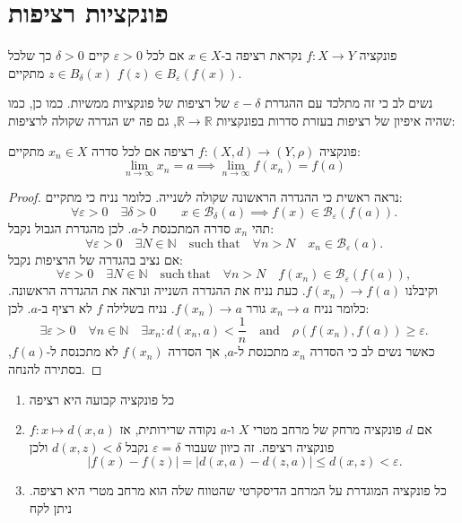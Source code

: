 \documentclass{tstextbook}
\begin{document}
\section{פונקציות רציפות}

\begin{definition}[רציפות]
פונקציה \(f:X\to Y\) נקראת רציפה ב-\(x \in X\) אם לכל \(\varepsilon>0\) קיים \(\delta>0\) כך שלכל \(z\in B_{\delta}(x)\) מתקיים \(f(z)\in B_{\varepsilon}(f(x))\).

\end{definition}
נשים לב כי זה מתלכד עם ההגדרת \(\varepsilon-\delta\) של רציפות של פונקציות ממשיות. כמו כן, כמו שהיה איפיון של רציפות בעזרת סדרות בפונקציות \(\mathbb{R}\to\mathbb{R}\), גם פה יש הגדרה שקולה לרציפות:

\begin{proposition}
פונקציה \(f:(X,d)\to\left( Y,\rho \right)\) רציפה אם לכל סדרה \(x_{n}\in X\) מתקיים:
$$\operatorname*{lim}_{n\to\infty}x_{n}=a\implies\operatorname*{lim}_{n\to\infty}f(x_{n})=f(a)$$

\end{proposition}
\begin{proof}
נראה ראשית כי ההגדרה הראשונה שקולה לשנייה. כלומר נניח כי מתקיים:
$$\forall\varepsilon>0\quad\exists\delta>0\qquad x\in{\mathcal{B}}_{\delta}(a)\implies f(x)\in{\mathcal{B}}_{\varepsilon}(f(a)).$$
תהי \(x_{n}\) סדרה המתכנסת ל-\(a\). לכן מהגדרת הגבול נקבל:
$$\forall\varepsilon>0\quad\exists N\in\mathbb{N}\quad\mathrm{such\;that}\quad\forall n>N\quad x_{n}\in\mathcal{B}_{\varepsilon}(a).$$
אם נציב בהגדרה של הרציפות נקבל:
$$\forall\varepsilon>0\quad\exists N\in\mathbb{N}\quad{\mathrm{such~that}}\quad\forall n>N\quad f(x_{n})\in{\mathcal{B}}_{\varepsilon}(f(a)),$$
וקיבלנו \(f(x_{n})\to f(a)\). כעת נניח את ההגדרה השנייה ונראה את ההגדרה הראשונה. כלומר נניח \(x_{n}\to a\) גורר \(f(x_{n})\to a\). נניח בשלילה \(f\) לא רציף ב-\(a\). לכן:
$$\exists\varepsilon>0\quad\forall n\in\mathbb{N}\quad\exists x_{n}:d(x_{n},a)<{\frac{1}{n}}\quad\mathrm{and}\quad\rho(f(x_{n}),f(a))\geq\varepsilon.$$
כאשר נשים לב כי הסדרה \(x_{n}\) מתכנסת ל-\(a\), אך הסדרה \(f(x_{n})\) לא מתכנסת ל-\(f(a)\), בסתירה להנחה.

\end{proof}
\begin{example}
  \begin{enumerate}
    \item כל פונקציה קבועה היא רציפה 


    \item אם \(d\) פונקציה מרחק של מרחב מטרי \(X\) ו-\(a\) נקודה שרירותית, אז \(f:x\mapsto d(x,a)\) פונקציה רציפה. זה כיוון שעבור \(\varepsilon=\delta\) נקבל \(d(x,z)<\delta\) ולכן\\
$$\left|f(x)-f(z)\right|=\left|d(x,a)-d(z,a)\right|\leq d(x,z)<\varepsilon.$$


    \item כל פונקציה המוגדרת על המרחב הדיסקרטי שהטווח שלה הוא מרחב מטרי היא רציפה. ניתן לקח 


  \end{enumerate}
\end{example}
\end{document}
